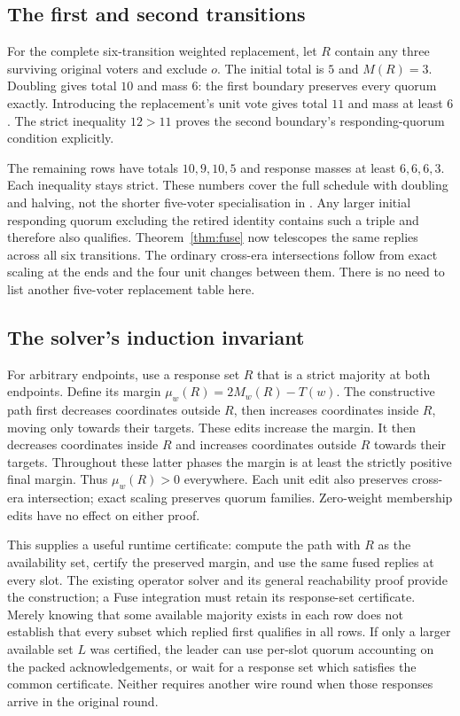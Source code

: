 \subsection{The first and second transitions}
For the complete six-transition weighted replacement, let $R$ contain any
three surviving original voters and exclude $o$. The initial total is $5$ and
$M(R)=3$. Doubling gives total $10$ and mass $6$: the first boundary preserves
every quorum exactly. Introducing the replacement's unit vote gives total $11$
and mass at least $6$. The strict inequality $12>11$ proves the second
boundary's responding-quorum condition explicitly.

The remaining rows have totals $10,9,10,5$ and response masses at least
$6,6,6,3$. Each inequality stays strict. These numbers cover the full schedule
with doubling and halving, not the shorter five-voter specialisation in
. Any larger initial responding quorum excluding
the retired identity contains such a triple and therefore also qualifies.
Theorem~\ref{thm:fuse} now telescopes the same replies across all six
transitions. The ordinary cross-era intersections follow from exact scaling
at the ends and the four unit changes between them. There is no need to list
another five-voter replacement table here.

\subsection{The solver's induction invariant}
For arbitrary endpoints, use a response set $R$ that is a strict majority at
both endpoints. Define its margin $\mu_w(R)=2M_w(R)-T(w)$. The constructive
path first decreases coordinates outside $R$, then increases coordinates
inside $R$, moving only towards their targets. These edits increase the
margin. It then decreases coordinates inside $R$ and increases coordinates
outside $R$ towards their targets. Throughout these latter phases the margin
is at least the strictly positive final margin. Thus $\mu_w(R)>0$ everywhere.
Each unit edit also preserves cross-era intersection; exact scaling preserves
quorum families. Zero-weight membership edits have no effect on either proof.

This supplies a useful runtime certificate: compute the path with $R$ as the
availability set, certify the preserved margin, and use the same fused replies
at every slot. The existing operator solver and its general reachability proof
provide the construction; a Fuse integration must retain its response-set
certificate. Merely knowing that some available majority exists in each row
does not establish that every subset which replied first qualifies in all rows.
If only a larger available set $L$ was certified, the leader can use per-slot
quorum accounting on the packed acknowledgements, or wait for a response set
which satisfies the common certificate. Neither requires another wire round
when those responses arrive in the original round.

